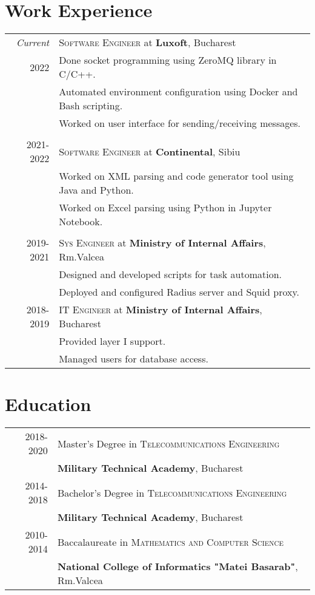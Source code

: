 \documentclass[a4paper,12pt]{article}
\begin{document}
\section{Work Experience}
\begin{tabular}{r|p{11cm}}

\emph{Current}
&\textsc{Software Engineer} at \textbf{Luxoft}, Bucharest\\
\textsc{2022}
&\footnotesize{Done socket programming using ZeroMQ library in C/C++.}\\
&\footnotesize{Automated environment configuration using Docker and Bash scripting.}\\
&\footnotesize{Worked on user interface for sending/receiving messages.}\\
\multicolumn{2}{c}{}\\
\textsc{2021-2022}
&\textsc{Software Engineer} at \textbf{Continental}, Sibiu\\
&\footnotesize{Worked on XML parsing and code generator tool using Java and Python.}\\
&\footnotesize{Worked on Excel parsing using Python in Jupyter Notebook.}\\
\multicolumn{2}{c}{}\\
\textsc{2019-2021} 
  &\textsc{Sys Engineer} at \textbf{Ministry of Internal Affairs}, Rm.Valcea\\
&\footnotesize{
  Designed and developed scripts for task automation.}\\
&\footnotesize{
  Deployed and configured Radius server and Squid proxy.}\\
\textsc{2018-2019} 
&\textsc{IT Engineer} at \textbf{Ministry of Internal Affairs}, Bucharest\\
&\footnotesize{Provided layer I support.}\\
&\footnotesize{Managed users for database access.}\\
\end{tabular}

\section{Education}
\begin{tabular}{rl}
\textsc{2018-2020}&Master's Degree in 
  \textsc{Telecommunications Engineering}\\
  &\textbf{Military Technical Academy}, Bucharest\\
\textsc{2014-2018}&Bachelor's Degree in
  \textsc{Telecommunications Engineering}\\
  &\textbf{Military Technical Academy}, Bucharest\\
\textsc{2010-2014}&Baccalaureate in 
  \textsc{Mathematics and Computer Science}\\
  &\textbf{National College of Informatics "Matei Basarab"}, Rm.Valcea\\
\end{tabular}
\end{document}
